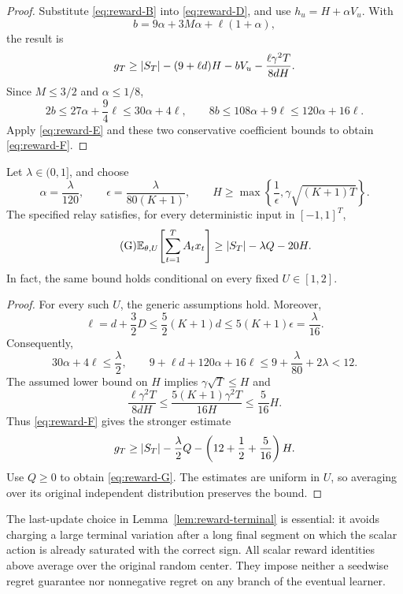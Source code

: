 \begin{proof}
Substitute \eqref{eq:reward-B} into \eqref{eq:reward-D}, and use
$h_u=H+\alpha V_u$. With
\[
 b=9\alpha+3M\alpha+\ell(1+\alpha),
\]
the result is
\[
 g_T\ge\left|S_T\right|-(9+\ell d)H-bV_u
                     -\frac{\ell\gamma^2T}{8dH}.
\]
Since $M\le3/2$ and $\alpha\le1/8$,
\[
 2b\le27\alpha+\frac94\ell\le30\alpha+4\ell,
 \qquad
 8b\le108\alpha+9\ell\le120\alpha+16\ell.
\]
Apply \eqref{eq:reward-E} and these two conservative coefficient bounds
to obtain \eqref{eq:reward-F}.
\end{proof}

\begin{lemma}\label{lem:good-reward}
Let $\lambda\in(0,1]$, and choose
\[
 \alpha=\frac{\lambda}{120},\qquad
 \epsilon=\frac{\lambda}{80(K+1)},\qquad
 H\ge\max\left\{\frac1\epsilon,
                       \gamma\sqrt{(K+1)T}\right\}.
\]
The specified relay satisfies, for every deterministic input in $[-1,1]^T$,
\begin{equation}\tag{G}\label{eq:reward-G}
 \mathbb E_{\theta,U}\!\left[\sum_{t=1}^T A_t x_t\right]
 \ge\left|S_T\right|-\lambda Q-20H.
\end{equation}
In fact, the same bound holds conditional on every fixed $U\in[1,2]$.
\end{lemma}

\begin{proof}
For every such $U$, the generic assumptions hold. Moreover,
\[
 \ell=d+\frac32D
 \le\frac52(K+1)d
 \le5(K+1)\epsilon=\frac{\lambda}{16}.
\]
Consequently,
\[
 30\alpha+4\ell\le\frac\lambda2,
 \qquad
 9+\ell d+120\alpha+16\ell
 \le9+\frac{\lambda}{80}+2\lambda<12.
\]
The assumed lower bound on $H$ implies $\gamma\sqrt T\le H$ and
\[
 \frac{\ell\gamma^2T}{8dH}
 \le\frac{5(K+1)\gamma^2T}{16H}\le\frac5{16}H.
\]
Thus \eqref{eq:reward-F} gives the stronger estimate
\[
 g_T\ge\left|S_T\right|-\frac\lambda2 Q
                    -\left(12+\frac12+\frac5{16}\right)H.
\]
Use $Q\ge0$ to obtain \eqref{eq:reward-G}. The estimates are uniform
in $U$, so averaging over its original independent distribution preserves
the bound.
\end{proof}

\begin{remark}
The last-update choice in Lemma~\ref{lem:reward-terminal} is essential:
it avoids charging a large terminal variation after a long final segment
on which the scalar action is already saturated with the correct sign.
All scalar reward identities above average over the original random
center. They impose neither a seedwise regret guarantee nor nonnegative
regret on any branch of the eventual learner.
\end{remark}
